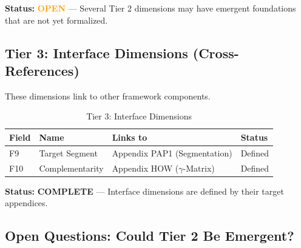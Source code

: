\textbf{Status:} \textcolor{orange}{\textbf{OPEN}} --- Several Tier 2 dimensions may have emergent foundations that are not yet formalized.

\subsection{Tier 3: Interface Dimensions (Cross-References)}

These dimensions link to other framework components.

\begin{table}[htbp]
\centering
\caption{Tier 3: Interface Dimensions}
\label{tab:hhh-tier3}
\renewcommand{\arraystretch}{1.3}
\begin{tabular}{@{}llll@{}}
\toprule
\textbf{Field} & \textbf{Name} & \textbf{Links to} & \textbf{Status} \\
\midrule
F9 & Target Segment & Appendix PAP1 (Segmentation) & \textcolor{green!60!black}{Defined} \\
F10 & Complementarity & Appendix HOW ($\gamma$-Matrix) & \textcolor{green!60!black}{Defined} \\
\bottomrule
\end{tabular}
\end{table}

\textbf{Status:} \textcolor{green!60!black}{\textbf{COMPLETE}} --- Interface dimensions are defined by their target appendices.

\subsection{Open Questions: Could Tier 2 Be Emergent?}

